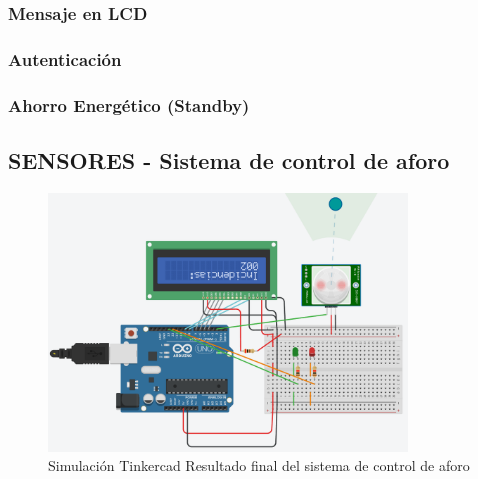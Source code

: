 \documentclass{article}
\begin{document}
\subsubsection{Mensaje en LCD}

\subsubsection{Autenticación}

\subsubsection{Ahorro Energético (Standby)}

\subsection{SENSORES - Sistema de control de aforo}


\begin{figure}[H]
    \centering
    \includegraphics[width=0.85\textwidth]{./img/ckpt_9.png}
    \caption{Simulación Tinkercad Resultado final del sistema de control de aforo}
    \label{fig:control_aforo}
\end{figure}
\end{document}
